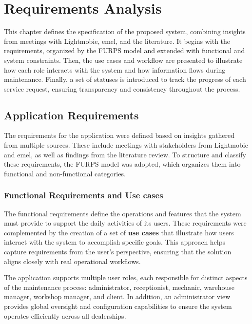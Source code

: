 \chapter{Requirements Analysis}%
\label{chapter:requirementsAnalysis}

\begin{introduction}
This chapter defines the specification of the proposed system, combining insights from meetings with Lightmobie, \acs{emel}, and the literature. It begins with the requirements, organized by the FURPS model and extended with functional and system constraints. Then, the use cases and workflow are presented to illustrate how each role interacts with the system and how information flows during maintenance. Finally, a set of statuses is introduced to track the progress of each service request, ensuring transparency and consistency throughout the process.
\end{introduction} 




\section{Application Requirements}
The requirements for the application were defined based on insights gathered from multiple sources. These include meetings with stakeholders from Lightmobie and \acs{emel}, as well as findings from the literature review. To structure and classify these requirements, the FURPS model was adopted, which organizes them into functional and non-functional categories. ~\cite{furps, furps2} 

\subsection{Functional Requirements and Use cases}
The functional requirements define the operations and features that the system must provide to support the daily activities of its users. These requirements were complemented by the creation of a set of \textbf{use cases} that illustrate how users interact with the system to accomplish specific goals. This approach helps capture requirements from the user’s perspective, ensuring that the solution aligns closely with real operational workflows.

The application supports multiple user roles, each responsible for distinct aspects of the maintenance process: administrator, receptionist, mechanic, warehouse manager, workshop manager, and client. In addition, an administrator view provides global oversight and configuration capabilities to ensure the system operates efficiently across all dealerships.


